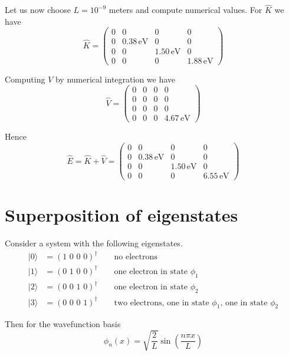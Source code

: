 \documentclass[12pt]{article}
\begin{document}
\noindent
Let us now choose $L=10^{-9}$ meters and compute numerical values.
For $\hat{K}$ we have
\begin{equation*}
\hat{K}=\begin{pmatrix}
0 & 0 & 0 & 0\\
0 & 0.38\,\text{eV} & 0 & 0\\
0 & 0 & 1.50\,\text{eV} & 0\\
0 & 0 & 0 & 1.88\,\text{eV}
\end{pmatrix}
\end{equation*}

\noindent
Computing $V$ by numerical integration we have
\begin{equation*}
\hat{V}=\begin{pmatrix}
0 & 0 & 0 & 0\\
0 & 0 & 0 & 0\\
0 & 0 & 0 & 0\\
0 & 0 & 0 & 4.67\,\text{eV}
\end{pmatrix}
\end{equation*}

\noindent
Hence
\begin{equation*}
\hat{E}=\hat{K}+\hat{V}=\begin{pmatrix}
0 & 0 & 0 & 0\\
0 & 0.38\,\text{eV} & 0 & 0\\
0 & 0 & 1.50\,\text{eV} & 0\\
0 & 0 & 0 & 6.55\,\text{eV}
\end{pmatrix}
\end{equation*}

\newpage

\section{Superposition of eigenstates}
Consider a system with the following eigenstates.
\begin{align*}
|0\rangle&=(\text{1 0 0 0})^\dag\qquad\text{no electrons}\\
|1\rangle&=(\text{0 1 0 0})^\dag\qquad\text{one electron in state $\phi_1$}\\
|2\rangle&=(\text{0 0 1 0})^\dag\qquad\text{one electron in state $\phi_2$}\\
|3\rangle&=(\text{0 0 0 1})^\dag\qquad\text{two electrons, one in state $\phi_1$, one in state $\phi_2$}
\end{align*}

\noindent
Then for the wavefunction basis
\begin{equation*}
\phi_n(x)=\sqrt{\frac{2}{L}}\sin\left(\frac{n\pi x}{L}\right)
\end{equation*}
\end{document}
